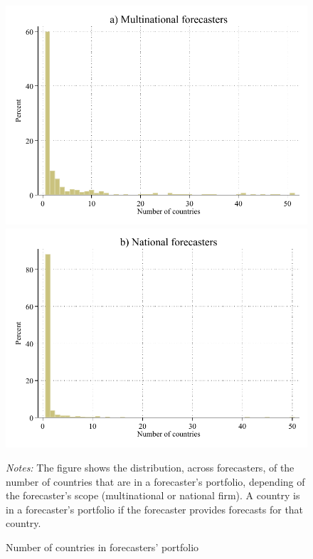 \documentclass[letterpaper,12pt]{article}
\newenvironment{fignote}{\footnotesize \begin{singlespace} \noindent}{\end{singlespace} \par }
\begin{document}
\begin{figure}[h]
\begin{center}
		\includegraphics[width=.4\linewidth]{../output/figures/hist_mult.pdf}
		\includegraphics[width=.4\linewidth]{../output/figures/hist_nat.pdf}	
	\caption{Number of countries in forecasters' portfolio}
	\label{fig:hist}
\end{center}
	\begin{fignote}
		\textit{Notes:} The figure shows the distribution, across forecasters, of the number of countries that are in a forecaster's portfolio, depending of the forecaster's scope (multinational or national firm). A country is in a forecaster's portfolio if the forecaster provides forecasts for that country.
	\end{fignote}
\end{figure}

\newpage
\end{document}
